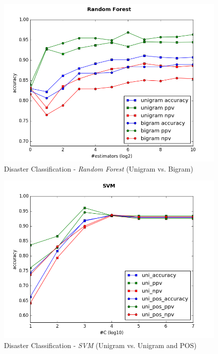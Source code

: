 \documentclass[letterpaper,twocolumn,10pt]{article}
\begin{document}
\begin{figure}[H]
	\centering
	\includegraphics[trim={0 0 0 1cm},clip,width=\columnwidth]{../graphs/DisasterClassification/random_forest_unigram_vs_bigram_features.png}
	\caption{Disaster Classification - \textit{Random Forest} (Unigram vs. Bigram)}
	\label{fig:disaster_classification_rf}
\end{figure}

\begin{figure}[H]
	\centering
	\includegraphics[trim={0 0 0 1cm},clip,width=\columnwidth]{../graphs/DisasterClassification/svm_uni_features.png}
	\caption{Disaster Classification - \textit{SVM} (Unigram vs. Unigram and POS)}
	\label{fig:disaster_classification_svm_uni}
\end{figure}
\end{document}
